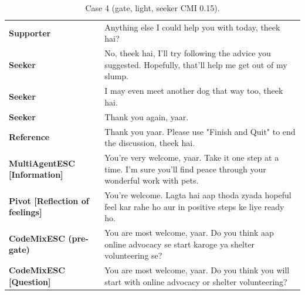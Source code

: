 \begin{table}[t]
\centering\footnotesize
\caption{Case 4 (gate, light, seeker CMI 0.15).}
\label{tab:case4}
\begin{tabular}{@{}p{}p{}@{}}
\toprule
\textbf{Supporter} & Anything else I could help you with today, theek hai? \\
\textbf{Seeker} & No, theek hai, I'll try following the advice you suggested. Hopefully, that'll help me get out of my slump. \\
\textbf{Seeker} & I may even meet another dog that way too, theek hai. \\
\textbf{Seeker} & Thank you again, yaar. \\
\textbf{Reference} & Thank you yaar. Please use "Finish and Quit" to end the discussion, theek hai. \\
\textbf{MultiAgentESC [Information]} & You're very welcome, yaar. Take it one step at a time. I'm sure you'll find peace through your wonderful work with pets. \\
\textbf{Pivot [Reflection of feelings]} & You're welcome. Lagta hai aap thoda zyada hopeful feel kar rahe ho aur in positive steps ke liye ready ho. \\
\textbf{CodeMixESC (pre-gate)} & You are most welcome, yaar. Do you think aap online advocacy se start karoge ya shelter volunteering se? \\
\textbf{CodeMixESC [Question]} & You are most welcome, yaar. Do you think you will start with online advocacy or shelter volunteering? \\
\bottomrule
\end{tabular}
\end{table}

